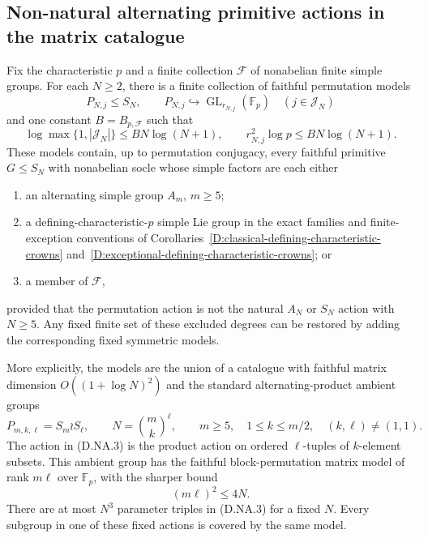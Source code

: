 \subsection{Non-natural alternating primitive actions in the matrix catalogue}

\begin{corollary}
\label{D:non-natural-alternating-primitive-models}
Fix the characteristic $p$ and a finite collection $\mathcal F$
of nonabelian finite simple groups. For each $N\ge2$, there
is a finite collection of faithful permutation models
\[
 P_{N,j}\le S_N,\qquad
 P_{N,j}\hookrightarrow\operatorname{GL}_{r_{N,j}}(\mathbb F_p)
                 \quad(j\in\mathcal J_N)                 \tag{D.NA.1}
\]
and one constant $B=B_{p,\mathcal F}$ such that
\[
 \log\max\{1,|\mathcal J_N|\}\le BN\log(N+1),\qquad
 r_{N,j}^2\log p\le BN\log(N+1).                         \tag{D.NA.2}
\]
These models contain, up to permutation conjugacy, every
faithful primitive $G\le S_N$ with nonabelian socle whose
simple factors are each either
\begin{enumerate}
\item an alternating simple group $A_m$, $m\ge5$;
\item a defining-characteristic-$p$ simple Lie group in
      the exact families and finite-exception conventions
      of Corollaries~\ref{D:classical-defining-characteristic-crowns}
      and~\ref{D:exceptional-defining-characteristic-crowns}; or
\item a member of $\mathcal F$,
\end{enumerate}
provided that the permutation action is not the natural
$A_N$ or $S_N$ action with $N\ge5$.
Any fixed finite set of these excluded degrees can be
restored by adding the corresponding fixed symmetric models.

More explicitly, the models are the union of a catalogue
with faithful matrix dimension $O((1+\log N)^2)$ and
the standard alternating-product ambient groups
\[
 P_{m,k,\ell}=S_m\wr S_\ell,
 \qquad N=\binom{m}{k}^{\ell},\qquad
 m\ge5,\quad 1\le k\le m/2,\quad (k,\ell)\ne(1,1).
                                                            \tag{D.NA.3}
\]
The action in (D.NA.3) is the product action on ordered
$\ell$-tuples of $k$-element subsets. This ambient group
has the faithful block-permutation matrix model of rank
$m\ell$ over $\mathbb F_p$, with the sharper bound
\[
                         (m\ell)^2\le4N.                \tag{D.NA.4}
\]
There are at most $N^3$ parameter triples in (D.NA.3)
for a fixed $N$. Every subgroup in one of these fixed
actions is covered by the same model.


\end{corollary}
